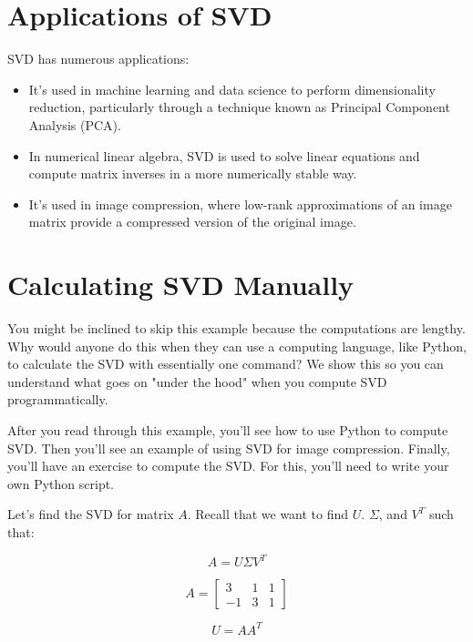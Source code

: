 \section{Applications of SVD}

SVD has numerous applications:

\begin{itemize}
\item It's used in machine learning and data science to perform
  dimensionality reduction, particularly through a technique known as
  Principal Component Analysis (PCA).

\item In numerical linear algebra, SVD is used to solve linear
  equations and compute matrix inverses in a more numerically stable
  way.

\item It's used in image compression, where low-rank approximations of
  an image matrix provide a compressed version of the original image.
\end{itemize}

\section{Calculating SVD Manually}
You might be inclined to skip this example because the computations are lengthy. Why would anyone do this when they can use a computing language, like Python, to calculate the SVD with essentially one command? We show this so you can understand what goes on "under the hood" when you compute SVD programmatically. 

After you read through this example, you'll see how to use Python to compute SVD. Then you'll see an example of using SVD for image compression. Finally, you'll have an exercise to compute the SVD. For this, you'll need to write your own Python script.

Let's find the SVD for matrix $A$. Recall that we want to find $U$. $\Sigma$, and $V^T$ such that:

\begin{equation}
A = U \Sigma V^T
\end{equation}

$$ A = \begin{bmatrix}
3 & 1 & 1  \\
 -1 & 3 & 1 
\end{bmatrix}$$

$$U = AA^T$$ 

